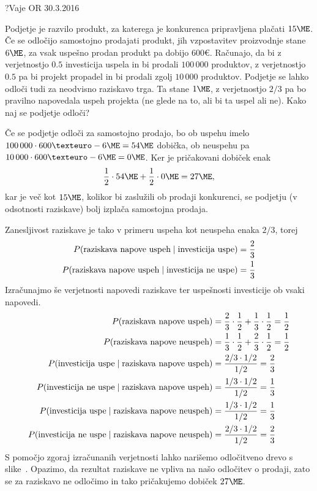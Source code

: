 \begin{naloga}{?}{Vaje OR 30.3.2016}
\begin{vprasanje}
Podjetje je razvilo produkt,
za katerega je konkurenca pripravljena plačati $15 \ME$.
Če se odločijo samostojno prodajati produkt,
jih vzpostavitev proizvodnje stane $6 \ME$,
za vsak uspešno prodan produkt pa dobijo $600 €$.
Računajo, da bi z ve\-rjet\-nost\-jo $0.5$ investicija uspela
in bi prodali $100\,000$ produktov,
z verjetnostjo $0.5$ pa bi projekt propadel
in bi prodali zgolj $10\,000$ produktov.
Podjetje se lahko odloči tudi za neodvisno raziskavo trga.
Ta stane $1 \ME$,
z verjetnostjo $2/3$ pa bo pravilno napovedala uspeh projekta
(ne glede na to, ali bi ta uspel ali ne).
Kako naj se podjetje odloči?
\end{vprasanje}

\begin{odgovor}
Če se podjetje odloči za samostojno prodajo,
bo ob uspehu imelo $100\,000 \cdot 600 € - 6 \ME = 54 \ME$ dobička,
ob neuspehu pa $10\,000 \cdot 600 € - 6 \ME = 0 \ME$.
Ker je pričakovani dobiček enak
$$
{1 \over 2} \cdot 54 \ME + {1 \over 2} \cdot 0 \ME = 27 \ME,
$$
kar je več kot $15 \ME$,
kolikor bi zaslužili ob prodaji konkurenci,
se podjetju (v odsotnosti raziskave) bolj izplača samostojna prodaja.

Zanesljivost raziskave je tako v primeru uspeha kot neuspeha enaka $2/3$,
torej
\begin{align*}
P(\text{raziskava napove uspeh} \;|\; \text{investicija uspe})
&= {2 \over 3} \\
P(\text{raziskava napove uspeh} \;|\; \text{investicija ne uspe})
&= {1 \over 3}
\end{align*}
Izračunajmo še verjetnosti napovedi raziskave
ter uspešnosti investicije ob vsaki napovedi.
\begin{align*}
P(\text{raziskava napove uspeh}) &=
{2 \over 3} \cdot {1 \over 2} + {1 \over 3} \cdot {1 \over 2} = {1 \over 2} \\
P(\text{raziskava napove neuspeh}) &=
{1 \over 3} \cdot {1 \over 2} + {2 \over 3} \cdot {1 \over 2} = {1 \over 2} \\
P(\text{investicija uspe} \;|\; \text{raziskava napove uspeh})
&= {2/3 \cdot 1/2 \over 1/2} = {2 \over 3} \\
P(\text{investicija ne uspe} \;|\; \text{raziskava napove uspeh})
&= {1/3 \cdot 1/2 \over 1/2} = {1 \over 3} \\
P(\text{investicija uspe} \;|\; \text{raziskava napove neuspeh})
&= {1/3 \cdot 1/2 \over 1/2} = {1 \over 3} \\
P(\text{investicija ne uspe} \;|\; \text{raziskava napove neuspeh})
&= {2/3 \cdot 1/2 \over 1/2} = {2 \over 3}
\end{align*}
S pomočjo zgoraj izračunanih verjetnosti
lahko narišemo odločitveno drevo s slike~\fig.
Opazimo, da rezultat raziskave ne vpliva na našo odločitev o prodaji,
zato se za raziskavo ne odločimo
in tako pričakujemo dobiček $27 \ME$.

\begin{slika}
\makebox[\textwidth][c]{
\pgfslika
}
\end{slika}
\end{odgovor}
\end{naloga}
